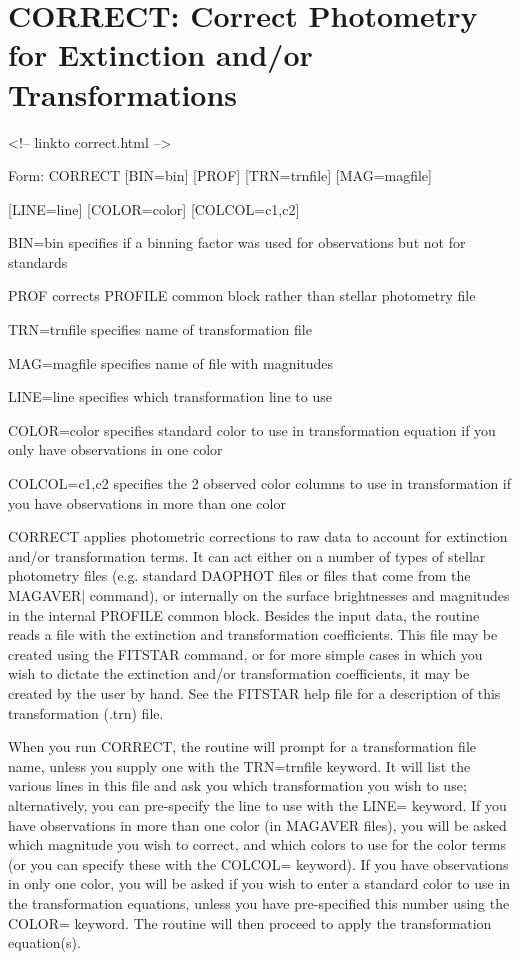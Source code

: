 \section{CORRECT: Correct Photometry for Extinction and/or Transformations}
\begin{rawhtml}
<!-- linkto correct.html -->
\end{rawhtml}
\begin{command}
  \item[Form: CORRECT  {[BIN=bin]} {[PROF]} {[TRN=trnfile]} {[MAG=magfile]}\hfill]{}
  \item{{[LINE=line]} {[COLOR=color]} {[COLCOL=c1,c2]}}
  \item[BIN=bin]{specifies if a binning factor was used
for observations but not for standards}
  \item[PROF]{corrects PROFILE common block rather than stellar photometry file}
  \item[TRN=trnfile]{specifies name of transformation file}
  \item[MAG=magfile]{ specifies name of file with magnitudes}
  \item[LINE=line ]{specifies which transformation line to use}
  \item[COLOR=color]{specifies standard color to use in
transformation equation if you only have observations in one color}
  \item[COLCOL=c1,c2  ]{  specifies the 2 observed color columns to 
use in transformation if you have observations in more than one color}
\end{command}


CORRECT applies photometric corrections to raw data to account for
extinction and/or transformation terms.  It can act either on a number of
types of stellar photometry files (e.g. standard DAOPHOT files or files
that come from the MAGAVER| command), or internally on the surface
brightnesses and magnitudes in the internal PROFILE common block. Besides
the input data, the routine reads a file with the extinction and
transformation coefficients. This file may be created using the FITSTAR
command, or for more simple cases in which you wish to dictate the
extinction and/or transformation coefficients, it may be created by the
user by hand. See the FITSTAR help file for a description of this
transformation (.trn) file.

When you run CORRECT, the routine will prompt for a transformation file
name, unless you supply one with the TRN=trnfile keyword.  It will list the
various lines in this file and ask you which transformation you wish to
use; alternatively, you can pre-specify the line to use with the LINE=
keyword. If you have observations in more than one color (in MAGAVER
files), you will be asked which magnitude you wish to correct, and which
colors to use for the color terms (or you can specify these with the
COLCOL= keyword).  If you have observations in only one color, you will be
asked if you wish to enter a standard color to use in the transformation
equations, unless you have pre-specified this number using the COLOR=
keyword. The routine will then proceed to apply the transformation
equation(s).

